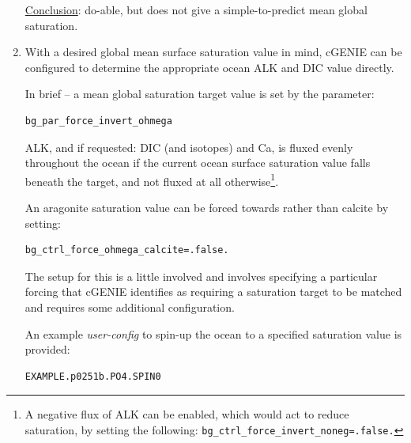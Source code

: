 \documentclass[11pt,fleqn]{book} %
\begin{document}
\begin{enumerate}
\uline{Conclusion}: do-able, but does not give a simple-to-predict mean global saturation.

\vspace{1mm}
\item With a desired global mean surface saturation value in mind, cGENIE can be configured to determine the appropriate ocean ALK and DIC value directly.

In brief -- a mean global saturation target value is set by the parameter:
\vspace{-1mm}\begin{verbatim}
bg_par_force_invert_ohmega
\end{verbatim}\vspace{-1mm}
ALK, and if requested: DIC (and isotopes) and Ca, is fluxed evenly throughout the ocean if the current ocean surface saturation value falls beneath the target, and not fluxed at all otherwise\footnote{A negative flux of ALK can be enabled, which would act to reduce saturation, by setting the following: \texttt{bg\_ctrl\_force\_invert\_noneg=.false.}}.

An aragonite saturation value can be forced towards rather than calcite by setting: 
\vspace{-1mm}\begin{verbatim}
bg_ctrl_force_ohmega_calcite=.false.
\end{verbatim}\vspace{-1mm}
The setup for this is a little involved and involves specifying a particular forcing that cGENIE identifies as requiring a saturation target to be matched and requires some additional configuration.

An example \textit{user-config} to spin-up the ocean to a specified saturation value is provided:
\vspace{-1mm}\small\begin{verbatim}
EXAMPLE.p0251b.PO4.SPIN0
\end{verbatim}\normalsize\vspace{-1mm}


\end{enumerate}
\end{document}
